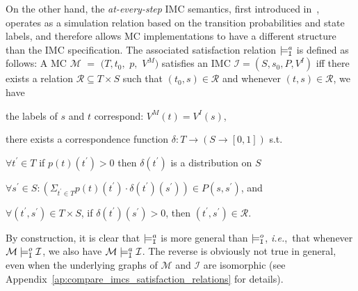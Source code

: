 \documentclass{llncs}
\newcommand{\mc}{\textnormal{MC}}
\newcommand{\imc}{\textnormal{IMC}}
\newcommand{\satisfactionImcOnce}{\ensuremath{\models^{o}_{\tt{I}}}}
\newcommand{\satisfactionImc}{\ensuremath{\models^{a}_{\tt{I}}}}
\newcommand{\ie} {{\em i.e.},\ }
\begin{document}
On the other hand, the {\em at-every-step} {\imc} semantics, first introduced
in~\cite{JonssonL91}, operates as a simulation relation based on the
transition probabilities and state labels, and therefore allows {\mc}
implementations to have a different structure than the {\imc}
specification. The associated satisfaction relation $\satisfactionImc$
is defined as follows: A {\mc} $\mathcal{M}$ $=$ $(T,
t_0,$ $p,$ $V^M)$ satisfies an {\imc} $\mathcal{I} = (S,s_0,P,V^I)$ iff
there exists a relation $\mathcal{R} \subseteq T \times S$ such that
$(t_0, s) \in \mathcal{R}$ and 
whenever $(t,s) \in \mathcal{R}$, we have \begin{enumerate*}
\item the labels of $s$ and $t$ correspond: $V^M(t) = V^I(s)$,
\item there exists a correspondence function $\delta: T \to (S \to [0, 1])$ s.t.
  \begin{enumerate*}
  \item $\forall t^\prime \in T$ if $p(t)(t^\prime) > 0$ then $\delta(t^\prime)$ is a distribution on $S$
  \item $\forall s^\prime \in S:
    (\Sigma_{t^\prime \in T} p(t)(t^\prime) \cdot \delta(t^\prime)(s^\prime)) \in P(s,s^\prime)$, and 
  \item $\forall (t^\prime,s^\prime) \in T \times S$, if $\delta(t^\prime)(s^\prime) > 0$, 
    then $(t^\prime, s^\prime) \in \mathcal{R}$.
    
  \end{enumerate*}
\end{enumerate*}
By construction, it is clear that $\satisfactionImc$ is more general
than $\satisfactionImcOnce$, \ie that whenever $\mathcal{M}
\satisfactionImcOnce \mathcal{I}$, we also have $\mathcal{M}
\satisfactionImc \mathcal{I}$. The reverse is obviously not true in
general, even when the underlying graphs of $\mathcal{M}$ and
$\mathcal{I}$ are isomorphic (see Appendix~\ref{ap:compare_imcs_satisfaction_relations} for details).
\end{document}

